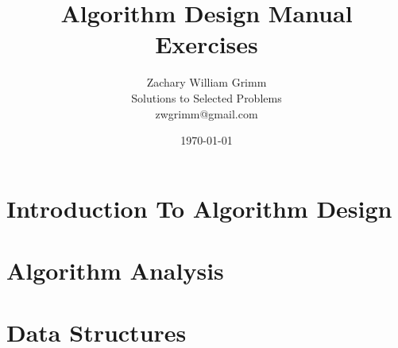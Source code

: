 \documentclass[10pt,letterpaper]{article}
\title{Algorithm Design Manual Exercises}
\author{Zachary William Grimm\\
  \small{Solutions to Selected Problems}\\
  \small{zwgrimm@gmail.com}
}
\date{\today{}}
\begin{document}
\maketitle

\tableofcontents{}

\newpage{}


\section{Introduction To Algorithm Design}




\section{Algorithm Analysis}


\section{Data Structures}










% 
\end{document}
